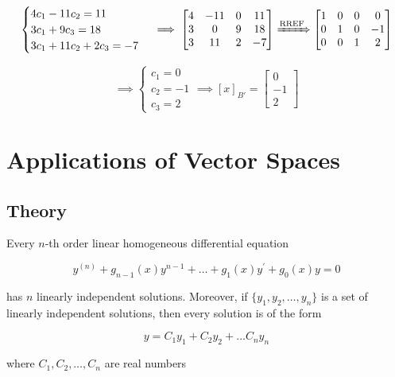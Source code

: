 \documentclass{report}
\begin{document}
$$
	\begin{cases}
		4c_1 - 11c_2 = 11 \\
		3c_1 + 9c_3 = 18 \\
		3c_1 + 11c_2 + 2c_3 = -7
	\end{cases}
	\implies \begin{bmatrix} 4 & -11 & 0 & 11 \\ 3 & 0 & 9 & 18 \\ 3 & 11 & 2 & - 7 \end{bmatrix}
	\xRightarrow{\text{RREF}}
	\begin{bmatrix} 1 & 0 & 0 & 0 \\ 0 & 1 & 0 & -1 \\ 0 & 0 & 1 & 2 \end{bmatrix}
$$

$$
\implies
\begin{cases}
	c_1 = 0 \\ c_2 = -1 \\ c_3 = 2 
\end{cases}
\implies 
[x]_{B'} = \begin{bmatrix} 0 \\ -1 \\ 2 \end{bmatrix}
$$

\section{Applications of Vector Spaces}

\subsection{Theory}

\begin{tcolorbox}[title = Solutions of a Linear Homogenous Differential Equation]
	Every $n$-th order linear homogeneous differential equation
	
	$$
	y^{(n)} + g_{n-1} (x) y^{n-1} + \hdots + g_1 (x) y^{'}  + g_0 (x) y = 0
	$$
	
	has $n$ linearly independent solutions. Moreover, if $\{y_1, y_2,\hdots, y_n\}$ is a set of linearly independent solutions, then every solution is of the form
	
	$$
	y = C_1 y_1 + C_2 y_2 + \hdots C_n y_n
	$$
	
	where $C_1, C_2, \hdots, C_n$ are real numbers
\end{tcolorbox}
\end{document}
